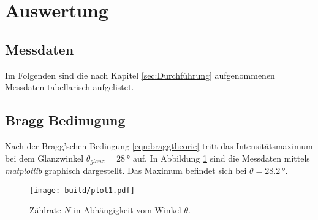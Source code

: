 \section{Auswertung}
\label{sec:Auswertung}
\subsection{Messdaten}
Im Folgenden sind die nach Kapitel \ref{sec:Durchführung} aufgenommenen Messdaten tabellarisch aufgelistet.



\subsection{Bragg Bedinugung}
\label{sec:brag}
Nach der Bragg'schen Bedingung \eqref{eqn:braggtheorie} tritt das Intensitätsmaximum bei dem Glanzwinkel $\theta_{glanz}=\SI{28}{\degree}$ auf.
In Abbildung \ref{fig:plot1} sind die Messdaten mittels \textit{matplotlib} \cite{matplotlib} graphisch dargestellt. Das Maximum befindet
sich bei $\theta=\SI{28.2}{\degree}$. 
\begin{figure}[H]
    \centering
    \texttt{[image: build/plot1.pdf]}
    \caption{Zählrate $N$ in Abhängigkeit vom Winkel $\theta$.}
    \label{fig:plot1}
\end{figure}

